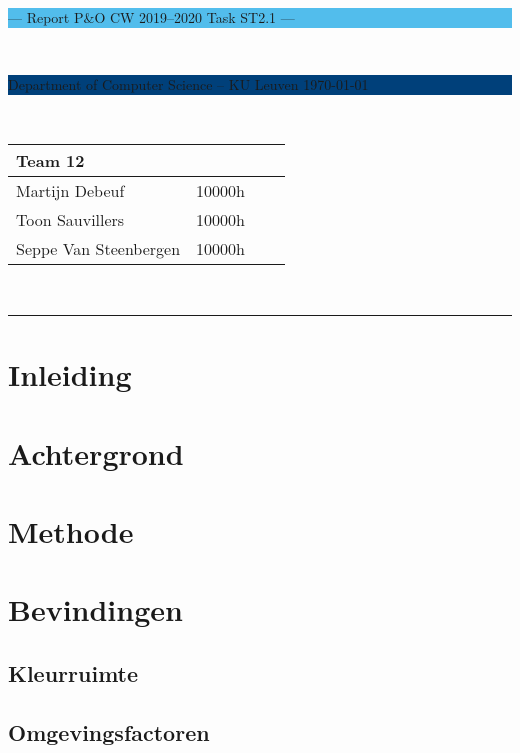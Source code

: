 \documentclass[a4paper,11pt]{article}
\begin{document}
\noindent
\colorbox[HTML]{52BDEC}{\bfseries\parbox{\textwidth}{\centering\large
  --- Report P\&O CW 2019--2020 Task ST2.1 ---
}}
\\[-1mm]
\colorbox[HTML]{00407A}{\bfseries\color{white}\parbox{\textwidth}{
  Department of Computer Science -- KU Leuven
  \hfill
  \today
}}
\\

\smallskip

\noindent
\begin{tabular}{*4l}
\toprule
\multicolumn{2}{l}{\large\textbf{Team 12}} \\
\midrule
Martijn Debeuf &  10000h\\ %
Toon Sauvillers &  10000h\\
Seppe Van Steenbergen & 10000h \\
\bottomrule
\hline
\end{tabular}\\

\noindent
{\color[HTML]{52BDEC} \rule{\linewidth}{1mm} }

\section{Inleiding}\label{sec:inleiding}
	

\section{Achtergrond}\label{sec:achtergrond}
	

\section{Methode}\label{sec:methode}
	

\section{Bevindingen}\label{sec:bevindingen}
	

	\subsection{Kleurruimte}\label{subsec:kleurruimte}
		
	\subsection{Omgevingsfactoren}\label{subsec:omgevingsfactoren}
		
\end{document}
